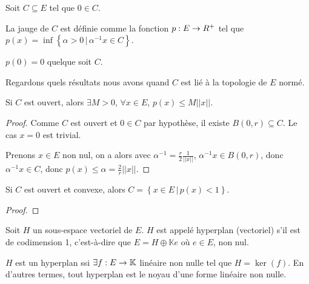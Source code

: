 \begin{definition} [Jauge]
	Soit $C \subseteq E$ tel que $0 \in C$.

	La jauge de $C$ est définie comme la fonction $p : E \rightarrow R^{+}$
	tel que $p(x) = \inf\left\{ \alpha > 0 \, | \, \alpha^{-1}x \in C\right\}$.
\end{definition}

\begin{exercice}
	$p(0) = 0$ quelque soit $C$.
\end{exercice}

Regardons quels résultats nous avons quand $C$ est lié à la topologie de $E$
normé.

\begin{proposition}
	Si $C$ est ouvert, alors $\exists M > 0$, $\forall x \in E$, $p(x) \leq M
	||x||$.
\end{proposition}

\begin{proof}

	Comme $C$ est ouvert et $0 \in C$ par hypothèse, il existe $B(0, r)
	\subseteq C$. Le cas $x = 0$ est trivial.

	Prenons $x \in E$ non nul, on a alors avec $\alpha^{-1} = \frac{r}{2} \frac{1}{||x||}$,
	$\alpha^{-1} x \in B(0, r)$, donc $\alpha^{-1} x \in C$, donc $p(x) \leq
	\alpha = \frac{2}{r} ||x||$.
\end{proof}

\begin{proposition}
	Si $C$ est ouvert et convexe, alors $C = \left\{x \in E \, | \, p(x) <
	1\right\}$.
\end{proposition}

\begin{proof}

\end{proof}

\begin{definition} [Hyperplan]
	Soit $H$ un sous-espace vectoriel de $E$. $H$ est appelé hyperplan
	(vectoriel) s'il est de codimension 1, c'est-à-dire que $E = H \oplus
	\mathbb{K}e$ où $e \in E$, non nul.
\end{definition}

\begin{proposition}
	$H$ est un hyperplan ssi $\exists f : E \rightarrow \mathbb{K}$
	linéaire non nulle tel que $H = \ker(f)$. En d'autres termes, tout hyperplan
	est le noyau d'une forme linéaire non nulle.
\end{proposition}


